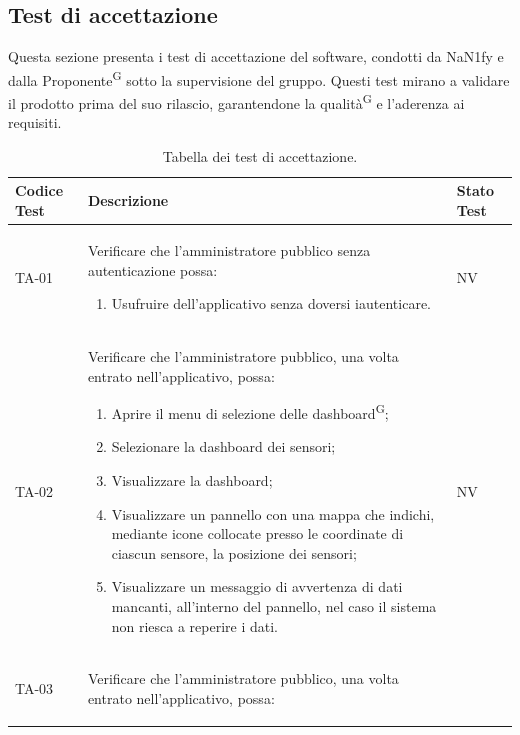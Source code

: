 \documentclass[8pt]{article}
\newcommand{\glossterm}[1]{#1\textsuperscript{G}} %
\begin{document}
\subsection{Test di accettazione}
Questa sezione presenta i test di accettazione del software, condotti da NaN1fy e dalla
\glossterm{Proponente} sotto la supervisione del gruppo. Questi test mirano a validare il prodotto prima del suo rilascio, garantendone la \glossterm{qualità} e l'aderenza ai requisiti.

\renewcommand{\arraystretch}{2.5}
\begin{longtable}{|>{\centering}p{2cm}|>{\RaggedRight}m{12cm}|>{\centering\arraybackslash}p{2cm}|}
    \hline
    \rowcolor{white}
    \textbf{Codice Test} & \textbf{Descrizione} & \textbf{Stato Test} \\
    \hline
    \endfirsthead 
    \rowcolor{white}
    \caption{Tabella dei test di accettazione.} 
    \label{table:Tabella dei test di accettazione}
    \endlastfoot  
    TA-01 & Verificare che l'amministratore pubblico senza autenticazione possa:
    \begin{enumerate}
        \setlength\itemsep{0em}
        \item Usufruire dell’applicativo senza doversi iautenticare.
    \end{enumerate} & NV \\
    \hline
    TA-02 & Verificare che l'amministratore pubblico, una volta entrato nell'applicativo, possa:
    \begin{enumerate}
        \setlength\itemsep{0em}
        \item Aprire il menu di selezione delle \glossterm{dashboard};
        \item Selezionare la dashboard dei sensori;
        \item Visualizzare la dashboard;
        \item Visualizzare un pannello con una mappa che indichi, mediante icone collocate presso le coordinate di ciascun sensore, la posizione dei sensori;
        \item Visualizzare un messaggio di avvertenza di dati mancanti, all’interno del pannello, nel caso il sistema non riesca a reperire i dati.
    \end{enumerate}
    & NV \\
    \hline
    TA-03 & Verificare che l'amministratore pubblico, una volta entrato nell'applicativo, possa:
    \begin{enumerate}
        \setlength\itemsep{0em}

\end{enumerate}
\end{longtable}
\end{document}
